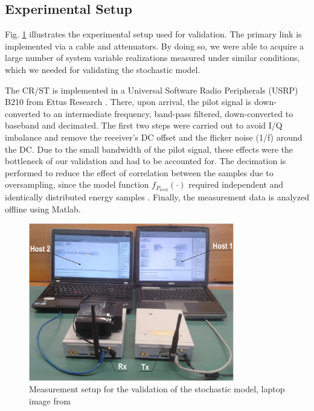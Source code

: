 \subsection{Experimental Setup}

Fig. \ref{messaufbau} illustrates the experimental setup used for validation. The primary link is implemented via a cable and attenuators. By doing so, we were able to acquire a large number of system variable realizations measured under similar conditions, which we needed for validating the stochastic model. 

The CR/ST is implemented in a Universal Software Radio Peripherals (USRP) B210 from Ettus Research \cite{Ettus}. There, upon arrival, the pilot signal is down-converted to an intermediate frequency, band-pass filtered, down-converted to baseband and decimated. The first two steps were carried out to avoid I/Q imbalance and remove the receiver's DC offset and the flicker noise (1/f) around the DC. Due to the small bandwidth of the pilot signal, these effects were the bottleneck of our validation and had to be accounted for. The decimation is performed to reduce the effect of correlation between the samples due to oversampling, since the model function $f_{P_\textrm{rcvd}}(\cdot)$ required independent and identically distributed energy samples \cite{Kaushik15}. Finally, the measurement data is analyzed offline using Matlab.

\begin{figure}
	\centering
	\includegraphics[width=0.8\textwidth]{figures/setup}
	\caption{Measurement setup for the validation of the stochastic model, laptop image from \cite{Laptop}}
	\label{messaufbau}
\end{figure}


